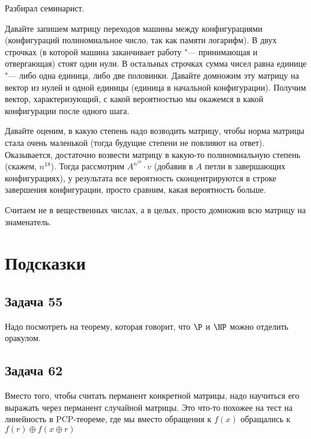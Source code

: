 	Разбирал семинарист.

	Давайте запишем матрицу переходов машины между конфигурациями (конфигураций полиномиальное число,
	так как памяти логарифм).
	В двух строчках (в которой машина заканчивает работу "--- принимающая и отвергающая) стоят одни нули.
	В остальных строчках сумма чисел равна единице "--- либо одна единица, либо две половинки.
	Давайте домножим эту матрицу на вектор из нулей и одной единицы (единица в начальной конфигурации).
	Получим вектор, характеризующий, с какой вероятностью мы окажемся в какой конфигурации после одного шага.

	Давайте оценим, в какую степень надо возводить матрицу, чтобы норма матрицы стала очень маленькой
	(тогда будущие степени не повлияют на ответ).
	Оказывается, достаточно возвести матрицу в какую-то полиномиальную степень (скажем, $n^{18}$).
	Тогда рассмотрим $A^{n^{18}} \cdot v$ (добавив в $A$ петли в завершающих конфигурациях),
	у результата все вероятность сконцентрируются в строке завершения конфигурации, просто сравним, какая вероятность больше.

	Считаем не в вещественных числах, а в целых, просто домножив всю матрицу на знаменатель.

\section{Подсказки}
\subsection{Задача 55}
	Надо посмотреть на теорему, которая говорит, что $\P$ и $\NP$ можно отделить оракулом.

\subsection{Задача 62}
	Вместо того, чтобы считать перманент конкретной матрицы, надо научиться его выражать через перманент случайной матрицы.
	Это что-то похожее на тест на линейность в PCP-теореме, где мы вместо обращения к $f(x)$ обращались к $f(r) \oplus f(x \oplus r)$
